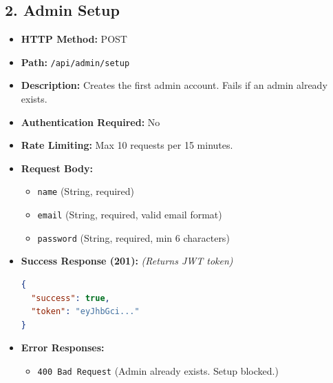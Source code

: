 \documentclass[12pt,a4paper]{article}
\begin{document}
\subsection{2. Admin Setup}
\begin{itemize}
    \item \textbf{HTTP Method:} POST
    \item \textbf{Path:} \texttt{/api/admin/setup}
    \item \textbf{Description:} Creates the first admin account. Fails if an admin already exists.
    \item \textbf{Authentication Required:} No
    \item \textbf{Rate Limiting:} Max 10 requests per 15 minutes.
    \item \textbf{Request Body:}
    \begin{itemize}
        \item \texttt{name} (String, required)
        \item \texttt{email} (String, required, valid email format)
        \item \texttt{password} (String, required, min 6 characters)
    \end{itemize}
    \item \textbf{Success Response (201):} \textit{(Returns JWT token)}
\begin{lstlisting}[language=json]
{
  "success": true,
  "token": "eyJhbGci..."
}
\end{lstlisting}
    \item \textbf{Error Responses:}
    \begin{itemize}
        \item \texttt{400 Bad Request} (Admin already exists. Setup blocked.)
    \end{itemize}
\end{itemize}
\end{document}
